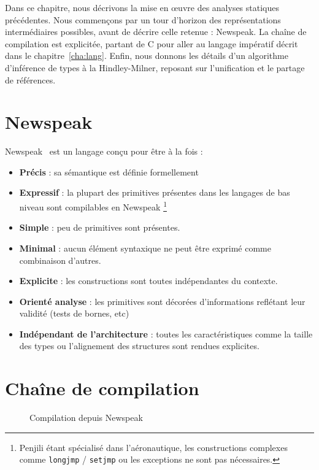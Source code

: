 Dans ce chapitre, nous décrivons la mise en œuvre des analyses statiques
précédentes. Nous commençons par un tour d'horizon des représentations
intermédiaires possibles, avant de décrire celle retenue : Newspeak. La chaîne
de compilation est explicitée, partant de C pour aller au langage impératif
décrit dans le chapitre~\ref{cha:lang}. Enfin, nous donnons les détails d'un
algorithme d'inférence de types à la Hindley-Milner, reposant sur l'unification
et le partage de références.

%

\section{Newspeak}
\label{sec:npk}

Newspeak~\cite{newspeak} est un langage conçu pour être à la fois :

\begin{itemize}
  \item \textbf{Précis} : sa sémantique est définie formellement
  \cite{HymansLevillainEADS08}
  \item \textbf{Expressif} : la plupart des primitives présentes dans les
    langages de bas niveau sont compilables en Newspeak \footnote{Penjili étant
    spécialisé dans l'aéronautique, les constructions complexes comme
    \texttt{longjmp} / \texttt{setjmp} ou les exceptions ne sont pas nécessaires.}
  \item \textbf{Simple} : peu de primitives sont présentes.
  \item \textbf{Minimal} : aucun élément syntaxique ne peut être exprimé
    comme combinaison d'autres.
  \item \textbf{Explicite} : les constructions sont toutes indépendantes du
    contexte.
  \item \textbf{Orienté analyse} : les primitives sont décorées d'informations
    reflétant leur validité (tests de bornes, etc)
  \item \textbf{Indépendant de l'architecture} : toutes les caractéristiques comme
    la taille des types ou l'alignement des structures sont rendues explicites.
\end{itemize}

\section{Chaîne de compilation}

\begin{figure}
  \centering
  
  \caption{Compilation depuis Newspeak}
  \label{fig:compil-npk}
\end{figure}

